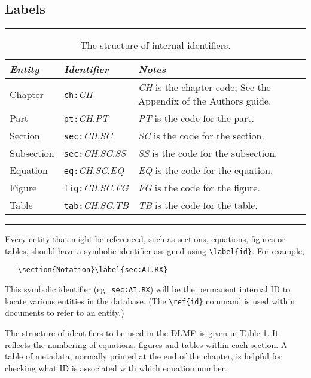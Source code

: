 \documentclass[twoside]{article}
\newcommand{\DLMF}{{\sc DLMF}}
\newenvironment{Table}[1]{%
   \begin{table}[htb]\hrule\begin{centering}\caption{#1}}{%
   \par\end{centering}\hrule\end{table}}
\newenvironment{Tabular}[1]{%
   \begingroup\def\arraystretch{1.3}\small \begin{tabular}{#1}}{%
   \end{tabular}\endgroup}
\begin{document}
\subsection{Labels}\label{sec:labels}
\begin{Table}{The structure of internal identifiers\label{tab:labels}.}
\begin{Tabular}{llp{2.5in}}
\textit{Entity} & \textit{Identifier} & \textit{Notes}\\\hline
Chapter & \texttt{ch:}\textit{CH}
 & \textit{CH} is the chapter code;
   See the Appendix of the Authors guide. \\
Part  & \texttt{pt:}\textit{CH}.\textit{PT} 
 & \textit{PT} is the code for the part.\\
Section  & \texttt{sec:}\textit{CH}.\textit{SC} 
 & \textit{SC} is the code for the section.\\
Subsection  & \texttt{sec:}\textit{CH}.\textit{SC}.\textit{SS}
 & \textit{SS} is the code for the subsection.\\
Equation  & \texttt{eq:}\textit{CH}.\textit{SC}.\textit{EQ}
 & \textit{EQ} is the code for the equation.\\
Figure  & \texttt{fig:}\textit{CH}.\textit{SC}.\textit{FG}
 & \textit{FG} is the code for the figure.\\
Table  & \texttt{tab:}\textit{CH}.\textit{SC}.\textit{TB}
 & \textit{TB} is the code for the table.\\
\end{Tabular}
\end{Table}
Every entity that might be referenced, such as sections, equations, figures 
or tables, should have a
symbolic identifier assigned using \verb|\label{id}|.  For example,
\begin{verbatim}
   \section{Notation}\label{sec:AI.RX}
\end{verbatim}
This symbolic identifier (eg.~\texttt{sec:AI.RX}) will be the permanent
internal ID to locate various entities in the database.
(The \verb|\ref{id}| command is used within documents to refer to an entity.)

The structure of identifiers to be used in the \DLMF\ is given in
Table \ref{tab:labels}.  It reflects the numbering of equations,
figures and tables within each section.  A table of metadata,
normally printed at the end of the chapter, is helpful for checking
what ID is associated with which equation number.
\end{document}
